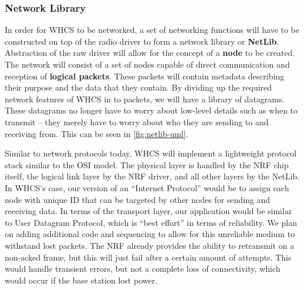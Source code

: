 \subsubsection{Network Library}
\label{sec:network-library}

In order for WHCS to be networked, a set of networking functions will have to
be constructed on top of the radio driver to form a network library or
\textbf{NetLib}. Abstraction of the raw driver will allow for the concept of a
\textbf{node} to be created. The network will consist of a set of nodes capable
of direct communication and reception of \textbf{logical packets}. These
packets will contain metadata describing their purpose and the data that they
contain. By dividing up the required network features of WHCS in to packets, we
will have a library of datagrams. These datagrams no longer have to worry about
low-level details such as when to transmit -- they merely have to worry about
who they are sending to and receiving from. This can be seen in
\autoref{fig:netlib-uml}.


Similar to network protocols today, WHCS will implement a lightweight protocol
stack similar to the OSI model. The physical layer is handled by the NRF chip
itself, the logical link layer by the NRF driver, and all other layers by the
NetLib. In WHCS's case, our version of an ``Internet Protocol'' would be to
assign each node with unique ID that can be targeted by other nodes for sending
and receiving data. In terms of the transport layer, our application would be
similar to User Datagram Protocol, which is ``best effort'' in terms of
reliability. We plan on adding additional code and sequencing to allow for this
unreliable medium to withstand lost packets. The NRF already provides the
ability to retransmit on a non-acked frame, but this will just fail after a
certain amount of attempts. This would handle transient errors, but not a
complete loss of connectivity, which would occur if the base station lost
power.

